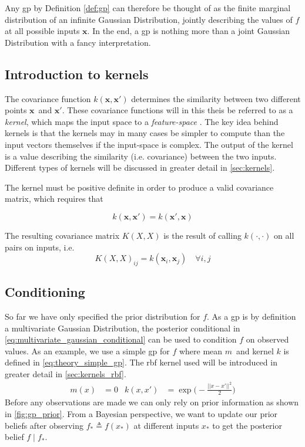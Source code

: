 Any \acrshort{gp} by Definition \ref{def:gp} can therefore be thought of as the finite marginal distribution of an infinite Gaussian Distribution, jointly describing the values of $f$ at all possible inputs $\boldsymbol{x}$. In the end, a \acrshort{gp} is nothing more than a joint Gaussian Distribution with a fancy interpretation.

\subsection{Introduction to kernels}
The covariance function $k(\boldsymbol{x}, \boldsymbol{x}')$ determines the similarity between two different points $\boldsymbol{x}$ and $\boldsymbol{x}'$. These covariance functions will in this theis be referred to as a \textit{kernel}, which maps the input space to a \textit{feature-space} \cite{rasmussen}. The key idea behind kernels is that the kernels may in many cases be simpler to compute than the input vectors themselves if the input-space is complex. The output of the kernel is a value describing the similarity (i.e. covariance) between the two inputs. Different types of kernels will be discussed in greater detail in \cref{sec:kernels}.

The kernel must be positive definite in order to produce a valid covariance matrix, which requires that

\begin{equation}
    k(\boldsymbol{x}, \boldsymbol{x}') = k(\boldsymbol{x}', \boldsymbol{x})
\end{equation}

The resulting covariance matrix $K(X, X)$ is the result of calling $k(\cdot, \cdot)$ on all pairs on inputs, i.e.
\begin{equation}
    K(X, X)_{ij} = k(\boldsymbol{x}_i, \boldsymbol{x}_j) \quad \forall i, j
\end{equation}

\subsection{Conditioning}
So far we have only specified the prior distribution for $f$. As a \acrshort{gp} is by definition a multivariate Gaussian Distribution, the posterior conditional in \cref{eq:multivariate_gaussian_conditional} can be used to condition $f$ on observed values. 
As an example, we use a simple \acrshort{gp} for $f$ where mean $m$ and kernel $k$ is defined in \cref{eq:theory_simple_gp}. The \acrshort{rbf} kernel used will be introduced in greater detail in \cref{sec:kernels_rbf}.
\begin{align}\label{eq:theory_simple_gp}
    m(x) &= 0 & k(x, x') &= \exp\bigg(-\frac{|| x - x'||^2}{2}\bigg)
\end{align}
Before any observations are made we can only rely on prior information as shown in \cref{fig:gp_prior}. From a Bayesian perspective, we want to update our prior beliefs after observing $f_* \triangleq f(x_*)$ at different inputs $x_*$ to get the posterior belief $f \; | \; f_*$.

